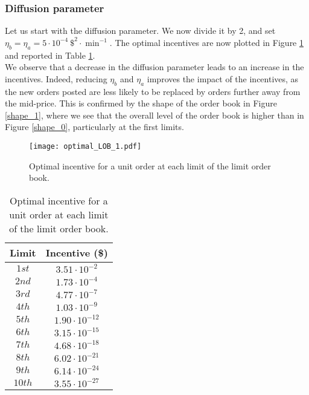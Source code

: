 \documentclass[11pt]{article}
\begin{document}
\subsubsection{Diffusion parameter}

Let us start with the diffusion parameter. We now divide it by 2, and set $\eta_b = \eta_a = 5 \cdot 10^{-4}\ \$^2 \cdot \min^{-1}$. The optimal incentives are now plotted in Figure \ref{opt_1} and reported in Table \ref{table_1}.\\

We observe that a decrease in the diffusion parameter leads to an increase in the incentives. Indeed, reducing $\eta_b$ and $\eta_a$ improves the impact of the incentives, as the new orders posted are less likely to be replaced by orders further away from the mid-price. This is confirmed by the shape of the order book in Figure \ref{shape_1}, where we see that the overall level of the order book is higher than in Figure \ref{shape_0}, particularly at the first limits. 

\begin{figure}[!h]\centering
\texttt{[image: optimal\_LOB\_1.pdf]}\\
\caption{Optimal incentive for a unit order at each limit of the limit order book.}\label{opt_1}
\end{figure}
\newpage
\begin{table}[!h]
\begin{center}
\begin{tabular}{c  c} 
 \hline 
Limit & Incentive (\$) \\ [0.5ex] 
 \hline
 $1st$ & $3.51 \cdot 10^{-2}$ \\ [0.5ex] 
 $2nd$ &  $1.73 \cdot 10^{-4}$ \\  [0.5ex] 
 $3rd$ &  $4.77 \cdot 10^{-7}$ \\ [0.5ex] 
 $4th$ &  $1.03 \cdot 10^{-9}$ \\ [0.5ex] 
 $5th$ &  $1.90 \cdot 10^{-12}$ \\ [0.5ex] 
 $6th$ &  $3.15 \cdot 10^{-15}$ \\ [0.5ex] 
 $7th$ &  $4.68 \cdot 10^{-18}$ \\ [0.5ex] 
 $8th$ &  $6.02 \cdot 10^{-21}$ \\ [0.5ex] 
 $9th$ &  $6.14 \cdot 10^{-24}$ \\ [0.5ex] 
 $10th$ &  $3.55\cdot 10^{-27}$ \\ [0.5ex] 
 \hline 
\end{tabular}
\end{center}
\caption {Optimal incentive for a unit order at each limit of the limit order book.}
\label{table_1}
\end{table}
\end{document}
